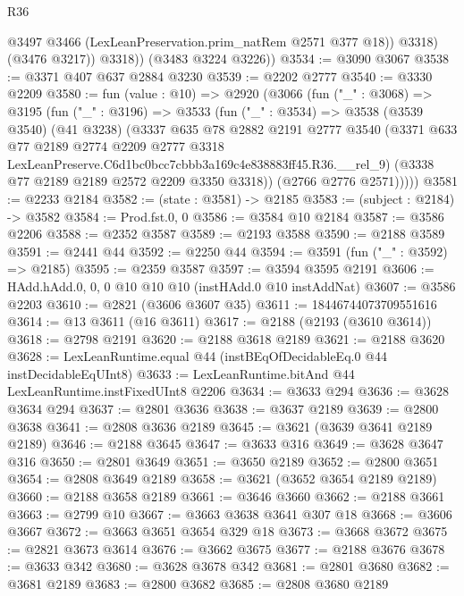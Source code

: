 \begin{lexlean}{R36}
\begin{coremodule}
                @3497
                @3466
                (LexLeanPreservation.prim_natRem @2571 @377 @18))
              @3318)
            (@3476 @3217))
          @3318))
      (@3483 @3224 @3226))
@3534 := @3090 @3067
@3538 := @3371 @407 @637 @2884 @3230
@3539 := @2202 @2777
@3540 := @3330 @2209
@3580 := fun (value : @10) =>
  @2920
    (@3066
      (fun ("_" : @3068) =>
      @3195
        (fun ("_" : @3196) =>
        @3533
          (fun ("_" : @3534) =>
          @3538
            (@3539 @3540)
            (@41 @3238)
            (@3337
              @635
              @78
              @2882
              @2191
              @2777
              @3540
              (@3371
                @633
                @77
                @2189
                @2774
                @2209
                @2777
                @3318
                LexLeanPreserve.C6d1bc0bcc7cbbb3a169c4e838883ff45.R36.__rel_9)
              (@3338 @77 @2189 @2189 @2572 @2209 @3350 @3318))
            (@2766 @2776 @2571)))))
@3581 := @2233 @2184
@3582 := (state : @3581) -> @2185
@3583 := (subject : @2184) -> @3582
@3584 := Prod.fst.{0, 0}
@3586 := @3584 @10 @2184
@3587 := @3586 @2206
@3588 := @2352 @3587
@3589 := @2193 @3588
@3590 := @2188 @3589
@3591 := @2441 @44
@3592 := @2250 @44
@3594 := @3591 (fun ("_" : @3592) => @2185)
@3595 := @2359 @3587
@3597 := @3594 @3595 @2191
@3606 := HAdd.hAdd.{0, 0, 0} @10 @10 @10 (instHAdd.{0} @10 instAddNat)
@3607 := @3586 @2203
@3610 := @2821 (@3606 @3607 @35)
@3611 := 18446744073709551616
@3614 := @13 @3611 (@16 @3611)
@3617 := @2188 (@2193 (@3610 @3614))
@3618 := @2798 @2191
@3620 := @2188 @3618 @2189
@3621 := @2188 @3620
@3628 := LexLeanRuntime.equal @44 (instBEqOfDecidableEq.{0} @44 instDecidableEqUInt8)
@3633 := LexLeanRuntime.bitAnd @44 LexLeanRuntime.instFixedUInt8 @2206
@3634 := @3633 @294
@3636 := @3628 @3634 @294
@3637 := @2801 @3636
@3638 := @3637 @2189
@3639 := @2800 @3638
@3641 := @2808 @3636 @2189
@3645 := @3621 (@3639 @3641 @2189 @2189)
@3646 := @2188 @3645
@3647 := @3633 @316
@3649 := @3628 @3647 @316
@3650 := @2801 @3649
@3651 := @3650 @2189
@3652 := @2800 @3651
@3654 := @2808 @3649 @2189
@3658 := @3621 (@3652 @3654 @2189 @2189)
@3660 := @2188 @3658 @2189
@3661 := @3646 @3660
@3662 := @2188 @3661
@3663 := @2799 @10
@3667 := @3663 @3638 @3641 @307 @18
@3668 := @3606 @3667
@3672 := @3663 @3651 @3654 @329 @18
@3673 := @3668 @3672
@3675 := @2821 @3673 @3614
@3676 := @3662 @3675
@3677 := @2188 @3676
@3678 := @3633 @342
@3680 := @3628 @3678 @342
@3681 := @2801 @3680
@3682 := @3681 @2189
@3683 := @2800 @3682
@3685 := @2808 @3680 @2189

\end{coremodule}
\end{lexlean}
